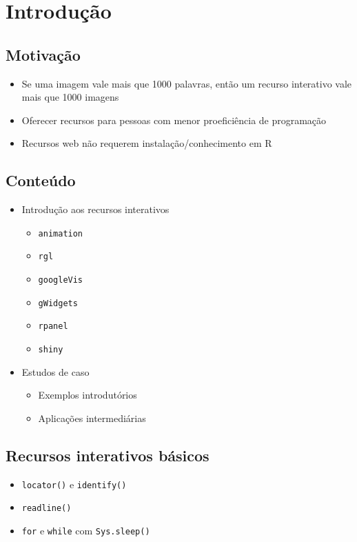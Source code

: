 \section{Introdução}

\subsection{Motivação}

\begin{frame}

  \begin{itemize}
  \item Se uma imagem vale mais que 1000 palavras, então um recurso
    interativo vale mais que 1000 imagens
  \item Oferecer recursos para pessoas com menor proeficiência de
    programação
  \item Recursos web não requerem instalação/conhecimento em R
  \end{itemize}

\end{frame}

\subsection{Conteúdo}

\begin{frame}

  \begin{itemize}
  \item Introdução aos recursos interativos
  
  \begin{itemize}
    \itemsep1pt\parskip0pt
  \item \texttt{animation}
  \item \texttt{rgl}
  \item \texttt{googleVis}
  \item \texttt{gWidgets}
  \item \texttt{rpanel}
  \item \texttt{shiny}
  \end{itemize}
\item Estudos de caso

  \begin{itemize}
  \item Exemplos introdutórios
  \item Aplicações intermediárias
  \end{itemize}
\end{itemize}

\end{frame}

\subsection{Recursos interativos básicos}

\begin{frame}

  \begin{itemize}
  \item \texttt{locator()} e \texttt{identify()}
  \item \texttt{readline()}
  \item \texttt{for} e \texttt{while} com \texttt{Sys.sleep()}
  \end{itemize}

\end{frame}
